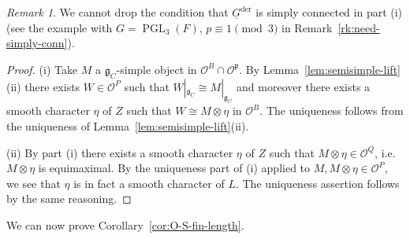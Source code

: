 \documentclass[a4paper]{amsart}
\numberwithin{equation}{section}
\theoremstyle{remark}
\newtheorem{remark}[thm]{Remark}
\theoremstyle{definition}
\DeclareMathOperator{\PGL}{PGL}
\newcommand{\alggrp}[1]{\underline{#1}}
\newcommand{\der}{\mathrm{der}}
\renewcommand{\simeq}{\cong}
\begin{document}
\begin{remark}\label{rk:need-simply-conn2}
  We cannot drop the condition that $\alggrp{G}^{\der}$ is simply connected in part (i) (see the example with $G = \PGL_3(F)$, $p \equiv 1\pmod 3$ in Remark~\ref{rk:need-simply-conn}).
\end{remark}

\begin{proof}
  (i) Take $M$ a $\mathfrak{g}_{C}$-simple object in $\mathcal{O}^{B} \cap \mathcal{O}^{\mathfrak{p}}$.
  By Lemma~\ref{lem:semisimple-lift}(ii) there exists $W\in \mathcal{O}^{P}$ such that $W|_{\mathfrak{g}_{C}}\simeq M|_{\mathfrak{g}_{C}}$ and moreover there exists a smooth character $\eta$ of $Z$ such that $W\simeq M\otimes \eta$ in $\mathcal{O}^{B}$.
  The uniqueness follows from the uniqueness of Lemma~\ref{lem:semisimple-lift}(ii).  
  
  (ii) By part (i) there exists a smooth character $\eta$ of $Z$ such that $M \otimes \eta \in \mathcal{O}^{Q}$, i.e. $M \otimes \eta$ is equimaximal.
  By the uniqueness part of (i) applied to $M, M \otimes \eta \in \mathcal{O}^{P}$, we see that $\eta$ is in fact a smooth character of $L$.
  The uniqueness assertion follows by the same reasoning.
\end{proof}

We can now prove Corollary~\ref{cor:O-S-fin-length}.
\end{document}
